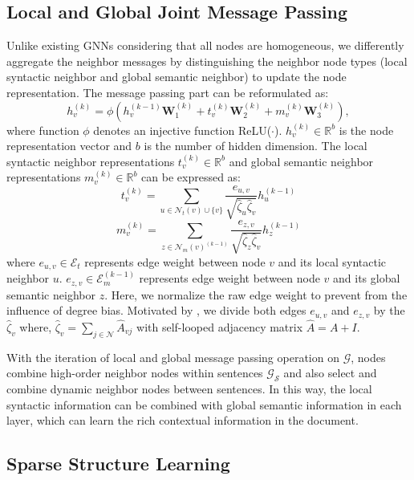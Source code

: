 \documentclass[letterpaper]{article} %
\begin{document}
\subsection{Local and Global Joint Message Passing }
Unlike existing GNNs considering that all nodes are homogeneous, we differently aggregate the neighbor messages by distinguishing the neighbor node types (local syntactic neighbor and global semantic neighbor) to update the node representation. The message passing part can be reformulated as:
\begin{equation}
h_{v}^{(k)}=\phi\left(h_{v}^{(k-1)}\mathbf{W}_1^{(k)}+t_{v}^{(k)}\mathbf{W}_2^{(k)}+m_v^{(k)}\mathbf{W}_3^{(k)}\right),
\end{equation}
where function $\phi$ denotes an injective function ReLU(\(\cdot\)). \(h_{v}^{(k)}\in\mathbb{R}^{b}\) is the node representation vector and $b$ is the number of hidden dimension. The local syntactic neighbor representations $t_{v}^{(k)}\in\mathbb{R}^{b}$ and global semantic neighbor representations $m_{v}^{(k)}\in\mathbb{R}^{b}$ can be expressed as:
\begin{equation}
{t}_{v}^{(k)} =\sum_{u\in{\mathcal{N}_t(v)\cup{\{v\}}}}\frac{e_{u,v}}{\sqrt{\hat{\zeta}_u\hat{\zeta}_v}}h_{u}^{(k-1)}
\end{equation}
\begin{equation}
m_{v}^{(k)}=\sum_{z\in{{\mathcal{N}_m(v)}}^{(k-1)}}\frac{e_{z,v}}{\sqrt{\hat{\zeta}_z\hat{\zeta}_v}}h_{z}^{(k-1)}
\end{equation}
where \(e_{u,v}\in\mathcal{E}_t\) represents edge weight between node $v$ and its local syntactic neighbor $u$. \(e_{z,v}\in\mathcal{E}^{(k-1)}_m\) represents edge weight between node $v$ and its global semantic neighbor $z$.
Here, we normalize the raw edge weight to prevent from the influence of degree bias. Motivated by \citet{kipf2017semi}, we divide both edges $e_{u,v}$ and $e_{z,v}$  by the $\hat{\zeta}_v$ where, $\hat{\zeta}_{v}=\sum_{j\in\mathcal{N}}\hat{A}_{vj}$ with self-looped adjacency matrix $\hat{A}=A+I$.

With the iteration of local and global message passing operation on $\mathcal{G}$, nodes combine high-order neighbor nodes within sentences $\mathcal{G}_\mathcal{S}$ and also select and combine dynamic neighbor nodes between sentences. In this way, the local syntactic information can be combined with global semantic information in each layer, which can learn the rich contextual information in the document. 

\subsection{Sparse Structure Learning}
\end{document}
